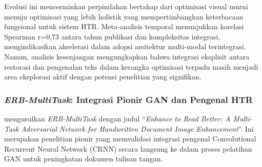 Evolusi ini mencerminkan perpindahan bertahap dari optimisasi visual murni menuju optimisasi yang lebih holistik yang mempertimbangkan keterbacaan fungsional untuk sistem HTR. Meta-analisis temporal menunjukkan korelasi Spearman r=0,73 antara tahun publikasi dan kompleksitas integrasi, mengindikasikan akselerasi dalam adopsi arsitektur multi-modal terintegrasi. Namun, analisis kesenjangan mengungkapkan bahwa integrasi eksplisit antara restorasi dan pengenalan teks dalam kerangka optimisasi terpadu masih menjadi area eksplorasi aktif dengan potensi penelitian yang signifikan.


\subsubsection{\textit{ERB-MultiTask}: Integrasi Pionir GAN dan Pengenal HTR}
\label{subsubsec:erb-multitask}


\textcite{erb2021} mengusulkan \textit{ERB-MultiTask} dengan judul ``\textit{Enhance to Read Better: A Multi-Task Adversarial Network for Handwritten Document Image Enhancement}''. Ini merupakan penelitian pionir yang memvalidasi integrasi pengenal Convolutional Recurrent Neural Network (CRNN) secara langsung ke dalam proses pelatihan GAN untuk peningkatan dokumen tulisan tangan.

